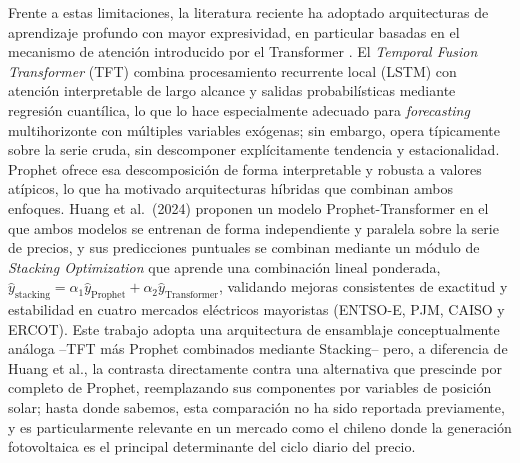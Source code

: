 \documentclass[applsci,article,submit,moreauthors,pdftex]{Definitions/mdpi}
\begin{document}
Frente a estas limitaciones, la literatura reciente ha adoptado arquitecturas de aprendizaje profundo con mayor expresividad, en particular basadas en el mecanismo de atención introducido por el Transformer \cite{Vaswani2017Attention}. El \textit{Temporal Fusion Transformer} (TFT) \cite{TFT} combina procesamiento recurrente local (LSTM) con atención interpretable de largo alcance y salidas probabilísticas mediante regresión cuantílica, lo que lo hace especialmente adecuado para \textit{forecasting} multihorizonte con múltiples variables exógenas; sin embargo, opera típicamente sobre la serie cruda, sin descomponer explícitamente tendencia y estacionalidad. Prophet \cite{Prophet} ofrece esa descomposición de forma interpretable y robusta a valores atípicos, lo que ha motivado arquitecturas híbridas que combinan ambos enfoques. Huang et al.\ (2024) \cite{ProphetTransformers} proponen un modelo Prophet-Transformer en el que ambos modelos se entrenan de forma independiente y paralela sobre la serie de precios, y sus predicciones puntuales se combinan mediante un módulo de \textit{Stacking Optimization} que aprende una combinación lineal ponderada, $\hat{y}_{\text{stacking}} = \alpha_1 \hat{y}_{\text{Prophet}} + \alpha_2 \hat{y}_{\text{Transformer}}$, validando mejoras consistentes de exactitud y estabilidad en cuatro mercados eléctricos mayoristas (ENTSO-E, PJM, CAISO y ERCOT). Este trabajo adopta una arquitectura de ensamblaje conceptualmente análoga --TFT más Prophet combinados mediante Stacking-- pero, a diferencia de Huang et al., la contrasta directamente contra una alternativa que prescinde por completo de Prophet, reemplazando sus componentes por variables de posición solar; hasta donde sabemos, esta comparación no ha sido reportada previamente, y es particularmente relevante en un mercado como el chileno donde la generación fotovoltaica es el principal determinante del ciclo diario del precio.
\end{document}
